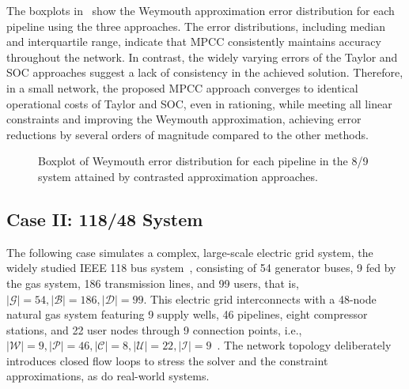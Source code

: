 The boxplots in~ show the Weymouth approximation error distribution for each pipeline using the three approaches. The error distributions, including median and interquartile range, indicate that MPCC consistently maintains accuracy throughout the network. In contrast, the widely varying errors of the Taylor and SOC approaches suggest a lack of consistency in the achieved solution. Therefore, in a small network, the proposed MPCC approach converges to identical operational costs of Taylor and SOC, even in rationing, while meeting all linear constraints and improving the Weymouth approximation, achieving error reductions by several orders of magnitude compared to the other methods.

\begin{figure}[!htb]
    \centering
    \setlength{}        
    \setlength{} 
    \resizebox{\figurewidth}{\figureheight}{}
    \caption{Boxplot of Weymouth error distribution for each pipeline in the 8/9 system attained by contrasted approximation approaches.}
    \label{fig:blue_test_boxplot}
\end{figure}



\subsection{Case II: 118/48 System}

The following case simulates a complex, large-scale electric grid system, the widely studied IEEE 118 bus system~\citep{WANG201970}, consisting of 54 generator buses, 9 fed by the gas system, 186 transmission lines, and 99 users, that is, $\left| \mathcal{G} \right| = 54, \left| \mathcal{B} \right| = 186, \left| \mathcal{D} \right| = 99$. This electric grid interconnects with a 48-node natural gas system featuring 9 supply wells, 46 pipelines, eight compressor stations, and 22 user nodes through 9 connection points, i.e., $\left| \mathcal{W} \right| = 9, \left| \mathcal{P} \right| = 46, \left| \mathcal{C} \right| = 8, \left| \mathcal{U} \right| = 22, \left| \mathcal{I} \right| = 9$~\citep{Conejo}. The network topology deliberately introduces closed flow loops to stress the solver and the constraint approximations, as do real-world systems.

